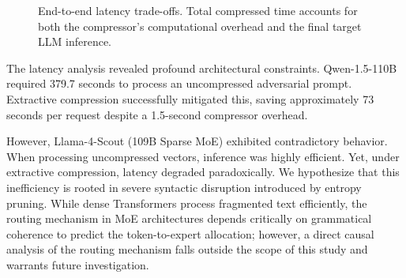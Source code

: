 \documentclass[conference]{IEEEtran}
\begin{document}
\begin{figure}[htbp]
\centering
{}
\caption{End-to-end latency trade-offs. Total compressed time accounts for both the compressor's computational overhead and the final target LLM inference.}
\label{fig:latency}
\end{figure}

The latency analysis revealed profound architectural constraints. Qwen-1.5-110B required 379.7 seconds to process an uncompressed adversarial prompt. Extractive compression successfully mitigated this, saving approximately 73 seconds per request despite a 1.5-second compressor overhead. 

However, Llama-4-Scout (109B Sparse MoE) exhibited contradictory behavior. When processing uncompressed vectors, inference was highly efficient. Yet, under extractive compression, latency degraded paradoxically. We hypothesize that this inefficiency is rooted in severe syntactic disruption introduced by entropy pruning. While dense Transformers process fragmented text efficiently, the routing mechanism in MoE architectures depends critically on grammatical coherence to predict the token-to-expert allocation; however, a direct causal analysis of the routing mechanism falls outside the scope of this study and warrants future investigation.
\end{document}
